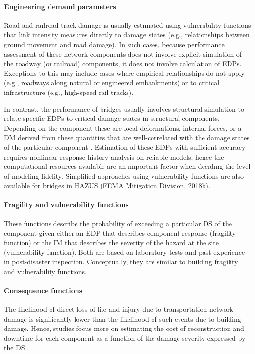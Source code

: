 \paragraph{Engineering demand parameters} Road and railroad track damage is usually estimated using vulnerability functions that link intensity measures directly to damage states (e.g., relationships between ground movement and road damage). In such cases, because performance assessment of these network components does not involve explicit simulation of the roadway (or railroad) components, it does not involve calculation of EDPs. Exceptions to this may include cases where empirical relationships do not apply (e.g., roadways along natural or engineered embankments) or to critical infrastructure (e.g., high-speed rail tracks).

In contrast, the performance of bridges usually involves structural simulation to relate specific EDPs to critical damage states in structural components. Depending on the component these are local deformations, internal forces, or a DM derived from these quantities \citep[e.g.,][]{park1985mechanistic} that are well-correlated with the damage states of the particular component \citep{choi2004seismic}. Estimation of these EDPs with sufficient accuracy requires nonlinear response history analysis on reliable models; hence the computational resources available are an important factor when deciding the level of modeling fidelity. Simplified approaches using vulnerability functions are also available for bridges in HAZUS (FEMA Mitigation Division, 2018b).

\paragraph{Fragility and vulnerability functions} These functions describe the probability of exceeding a particular DS of the component given either an EDP that describes component response (fragility function) or the IM that describes the severity of the hazard at the site (vulnerability function). Both are based on laboratory tests and past experience in post-disaster inspection. Conceptually, they are similar to building fragility and vulnerability functions.

\paragraph{Consequence functions} The likelihood of direct loss of life and injury due to transportation network damage is significantly lower than the likelihood of such events due to building damage. Hence, studies focus more on estimating the cost of reconstruction and downtime for each component as a function of the damage severity expressed by the DS \citep{stergiou2006treatment}. 


